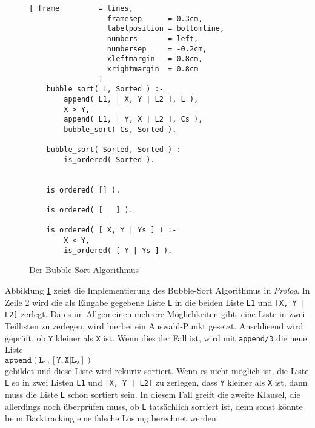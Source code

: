 \begin{figure}[!h]
  \centering
\begin{Verbatim}[ frame         = lines, 
                  framesep      = 0.3cm, 
                  labelposition = bottomline,
                  numbers       = left,
                  numbersep     = -0.2cm,
                  xleftmargin   = 0.8cm,
                  xrightmargin  = 0.8cm
                ]
    bubble_sort( L, Sorted ) :-
        append( L1, [ X, Y | L2 ], L ),
        X > Y,
        append( L1, [ Y, X | L2 ], Cs ),
        bubble_sort( Cs, Sorted ).
    
    bubble_sort( Sorted, Sorted ) :-
        is_ordered( Sorted ).
    
    
    is_ordered( [] ).
    
    is_ordered( [ _ ] ).
    
    is_ordered( [ X, Y | Ys ] ) :-
        X < Y,
        is_ordered( [ Y | Ys ] ).
\end{Verbatim}
\vspace*{-0.3cm}
  \caption{Der Bubble-Sort Algorithmus}
  \label{fig:bubble_sort}
\end{figure}

Abbildung \ref{fig:bubble_sort} zeigt die Implementierung des Bubble-Sort Algorithmus in
\textsl{Prolog}.  In Zeile 2 wird die als Eingabe gegebene Liste \texttt{L} in die beiden
Liste \texttt{L1} und \texttt{[X, Y | L2]} zerlegt.  Da es im Allgemeinen mehrere
M\"{o}glichkeiten gibt,  eine Liste in zwei Teillisten zu zerlegen, wird hierbei ein
Auswahl-Punkt gesetzt.  Anschlie\3end wird gepr\"{u}ft, ob \texttt{Y} kleiner als \texttt{X}
ist.  Wenn dies der Fall ist, wird mit \texttt{append/3} die neue Liste 
\\[0.1cm]
\hspace*{1.3cm} $\mathtt{append(L_1, [Y,X|L_2])}$ \\[0.1cm]
gebildet und diese Liste wird rekuriv sortiert.  Wenn es nicht m\"{o}glich ist,
die Liste \texttt{L} so in zwei Listen \texttt{L1} und \texttt{[X, Y | L2]} zu zerlegen,
dass \texttt{Y} kleiner als \texttt{X} ist, dann muss die Liste \texttt{L} schon sortiert
sein.  In diesem Fall greift die zweite Klausel, die allerdings noch \"{u}berpr\"{u}fen muss, ob
\texttt{L} tats\"{a}chlich sortiert ist, denn sonst k\"{o}nnte beim Backtracking eine falsche
L\"{o}sung berechnet werden.

